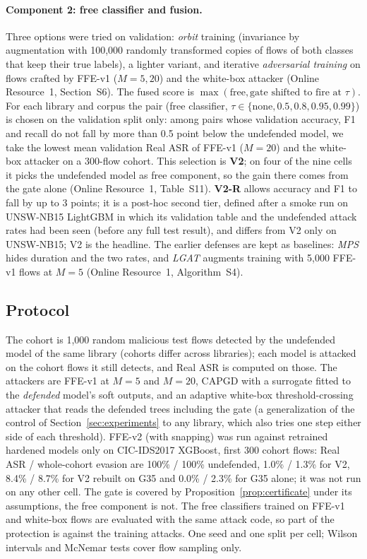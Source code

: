 \paragraph{Component 2: free classifier and fusion.} Three options were tried on validation: \emph{orbit} training (invariance by augmentation with 100,000 randomly transformed copies of flows of both classes that keep their true labels), a lighter variant, and iterative \emph{adversarial training} on flows crafted by FFE-v1 ($M=5,20$) and the white-box attacker (Online Resource~1, Section~S6). The fused score is $\max(\text{free},\text{gate shifted to fire at }\tau)$. For each library and corpus the pair (free classifier, $\tau\in\{\text{none},0.5,0.8,0.95,0.99\}$) is chosen on the validation split only: among pairs whose validation accuracy, F1 and recall do not fall by more than 0.5 point below the undefended model, we take the lowest mean validation Real ASR of FFE-v1 ($M=20$) and the white-box attacker on a 300-flow cohort. This selection is \textbf{V2}; on four of the nine cells it picks the undefended model as free component, so the gain there comes from the gate alone (Online Resource~1, Table~S11). \textbf{V2-R} allows accuracy and F1 to fall by up to 3 points; it is a post-hoc second tier, defined after a smoke run on UNSW-NB15 LightGBM in which its validation table and the undefended attack rates had been seen (before any full test result), and differs from V2 only on UNSW-NB15; V2 is the headline. The earlier defenses are kept as baselines: \emph{MPS} hides duration and the two rates, and \emph{LGAT} augments training with 5,000 FFE-v1 flows at $M=5$ (Online Resource~1, Algorithm~S4).

\subsection{Protocol}

The cohort is 1,000 random malicious test flows detected by the undefended model of the same library (cohorts differ across libraries); each model is attacked on the cohort flows it still detects, and Real ASR is computed on those. The attackers are FFE-v1 at $M=5$ and $M=20$, CAPGD with a surrogate fitted to the \emph{defended} model's soft outputs, and an adaptive white-box threshold-crossing attacker that reads the defended trees including the gate (a generalization of the control of Section~\ref{sec:experiments} to any library, which also tries one step either side of each threshold). FFE-v2 (with snapping) was run against retrained hardened models only on CIC-IDS2017 XGBoost, first 300 cohort flows: Real ASR / whole-cohort evasion are 100\% / 100\% undefended, 1.0\% / 1.3\% for V2, 8.4\% / 8.7\% for V2 rebuilt on G35 and 0.0\% / 2.3\% for G35 alone; it was not run on any other cell. The gate is covered by Proposition~\ref{prop:certificate} under its assumptions, the free component is not. The free classifiers trained on FFE-v1 and white-box flows are evaluated with the same attack code, so part of the protection is against the training attacks. One seed and one split per cell; Wilson intervals and McNemar tests cover flow sampling only.

